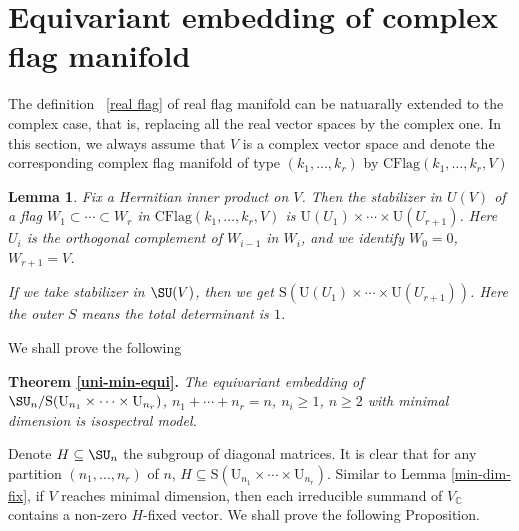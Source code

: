 \documentclass[a4paper]{amsart}
\newcommand{\BC}{{\mathbb {C}}} \newcommand{\BD}{{\mathbb {D}}}
\newcommand{\RO}{{\mathrm {O}}} \newcommand{\RP}{{\mathrm {P}}}
\newcommand{\RS}{{\mathrm {S}}} \newcommand{\RT}{{\mathrm {T}}}
\newcommand{\RU}{{\mathrm {U}}} \newcommand{\RV}{{\mathrm {V}}}
\newcommand{\CFlag}{\mathrm{CFlag}}
\newcommand{\SO}{{\mathrm{SO}}}\newcommand{\so}{\mathfrak{so}}
\theoremstyle{plain}
\newtheorem{lem}[thm]{Lemma}
\theoremstyle{remark} \newtheorem{remark}[thm]{Remark}
\theoremstyle{remark} \newtheorem{exercise}{Exercise}
\theoremstyle{remark} \newtheorem{example}{Example}
\numberwithin{equation}{section}
\begin{document}





\section{Equivariant embedding of complex flag manifold}
The definition ~\ref{real flag} of real flag manifold can be natuarally extended to the complex case, that is, replacing all the real vector spaces by the complex one. In this section, we always assume that $V$ is a complex vector space and denote the corresponding complex flag manifold of type $(k_1,\dots,k_r)$ by $\CFlag(k_1,\dots,k_r,V)$


\begin{lem}\label{lemma: stablizer of complex flag manifold1}
	Fix a Hermitian inner product on $V$. Then the stabilizer in $U(V)$ of a flag $W_1\subset\cdots\subset W_r$ in $\CFlag(k_1,\ldots,k_r,V)$ is $\RU(U_1)\times\cdots\times\RU(U_{r+1})$. Here $U_i$ is the orthogonal complement of $W_{i-1}$ in $W_i$, and we identify $W_0=0$, $W_{r+1}=V$.
	
	If we take stabilizer in $\SU(V)$, then we get $\RS(\RU(U_1)\times\cdots\times\RU(U_{r+1}))$. Here the outer $S$ means the total determinant is $1$.
\end{lem}

We shall prove the following

\noindent\textbf{Theorem \ref{uni-min-equi}.} {\it
    The equivariant embedding of $\SU_n/\RS(\RU_{n_1}\times\cdots\times\RU_{n_r})$, $n_1+\cdots+n_r=n$, $n_i\geqslant 1$, $n\geqslant 2$ with minimal dimension is isospectral model.}


Denote $H\subseteq\SU_n$ the subgroup of diagonal matrices. It is clear that for any partition $(n_1,\ldots,n_r)$ of $n$, $H\subseteq\RS(\RU_{n_1}\times\cdots\times\RU_{n_r})$. Similar to Lemma \ref{min-dim-fix}, if $V$ reaches minimal dimension, then each irreducible summand of $V_\BC$ contains a non-zero $H$-fixed vector. We shall prove the following Proposition.
\end{document}
